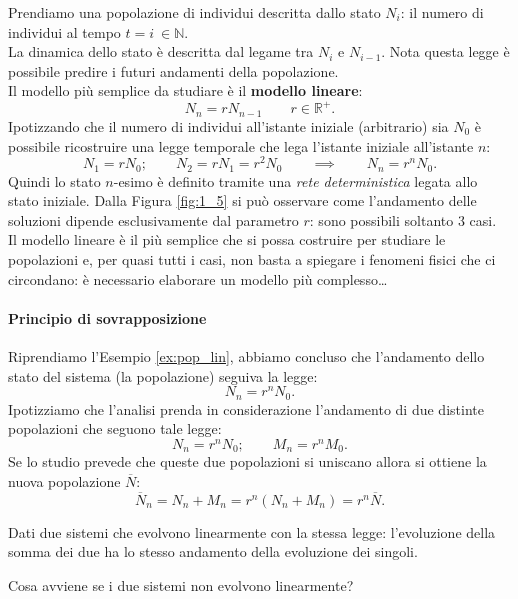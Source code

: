 \noindent
\begin{exmp}
    \label{ex:pop_lin}
   Prendiamo una popolazione di individui descritta dallo stato $N_i$: il numero di individui al tempo $t=i \ \in \mathbb{N}$. \\
   La dinamica dello stato è descritta dal legame tra $N_i$ e $N_{i-1}$. Nota questa legge è possibile predire i futuri andamenti della popolazione.\\
   Il modello più semplice da studiare è il \textbf{modello lineare}:
   \[
       N_n = r N_{n-1} \qquad r \in \mathbb{R}^+
   .\] 
   Ipotizzando che il numero di individui all'istante iniziale (arbitrario) sia $N_0$ è possibile ricostruire una legge temporale che lega l'istante iniziale all'istante $n$:
   \[
       N_1 = rN_0; \qquad N_2 = rN_1=r^2N_0 \qquad \implies \qquad N_n = r^{n}N_0
   .\] 
   Quindi lo stato $n$-esimo è definito tramite una \textit{rete deterministica} legata allo stato iniziale.
   Dalla Figura \ref{fig:1_5} si può osservare come l'andamento delle soluzioni dipende esclusivamente dal parametro $r$: sono possibili soltanto 3 casi.\\
   Il modello lineare è il più semplice che si possa costruire per studiare le popolazioni e, per quasi tutti i casi, non basta a spiegare i fenomeni fisici che ci circondano: è necessario elaborare un modello più complesso\ldots
\end{exmp}
\noindent
\paragraph{Principio di sovrapposizione}%
\label{par:Principio di sovrapposizione}
Riprendiamo l'Esempio \ref{ex:pop_lin}, abbiamo concluso che l'andamento dello stato del sistema (la popolazione) seguiva la legge:
\[
    N_n = r^nN_0
.\] 
Ipotizziamo che l'analisi prenda in considerazione l'andamento di due distinte popolazioni che seguono tale legge:
\[
    N_n = r^nN_0; \qquad M_n = r^nM_0
.\] 
Se lo studio prevede che queste due popolazioni si uniscano allora si ottiene la nuova popolazione $\overline{N}$:
\[
    \overline{N}_n = N_n + M_n = r^n(N_n + M_n) = r^n \overline{N}
.\] 
\begin{thm}
    Dati due sistemi che evolvono linearmente con la stessa legge: l'evoluzione della somma dei due ha lo stesso andamento della evoluzione dei singoli. 
\end{thm}
\noindent
Cosa avviene se i due sistemi non evolvono linearmente?
